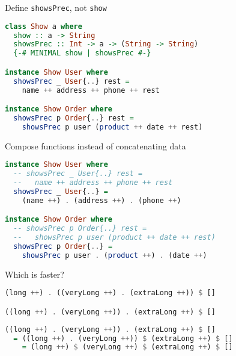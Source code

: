 \documentclass[handout]{beamer}
\begin{document}
\begin{frame}[fragile]{Define {\tt showsPrec}, not {\tt show}}

\begin{lstlisting}[language=Haskell]
class Show a where
  show :: a -> String
  showsPrec :: Int -> a -> (String -> String)
  {-# MINIMAL show | showsPrec #-}

instance Show User where
  showsPrec _ User{..} rest =
    name ++ address ++ phone ++ rest

instance Show Order where
  showsPrec p Order{..} rest =
    showsPrec p user (product ++ date ++ rest)
\end{lstlisting}

\end{frame}

\begin{frame}[fragile]{Compose functions instead of concatenating data}

\begin{lstlisting}[language=Haskell]
instance Show User where
  -- showsPrec _ User{..} rest =
  --   name ++ address ++ phone ++ rest
  showsPrec _ User{..} =
    (name ++) . (address ++) . (phone ++)

instance Show Order where
  -- showsPrec p Order{..} rest =
  --   showsPrec p user (product ++ date ++ rest)
  showsPrec p Order{..} =
    showsPrec p user . (product ++) . (date ++)
\end{lstlisting}

\end{frame}

\begin{frame}[fragile]{Which is faster?}

\begin{lstlisting}[language=Haskell]
(long ++) . ((veryLong ++) . (extraLong ++)) $ []

((long ++) . (veryLong ++)) . (extraLong ++) $ []
\end{lstlisting}

\begin{lstlisting}[language=Haskell]
((long ++) . (veryLong ++)) . (extraLong ++) $ []
  = ((long ++) . (veryLong ++)) $ (extraLong ++) $ []
    = (long ++) $ (veryLong ++) $ (extraLong ++) $ []
\end{lstlisting}

\end{frame}
\end{document}
